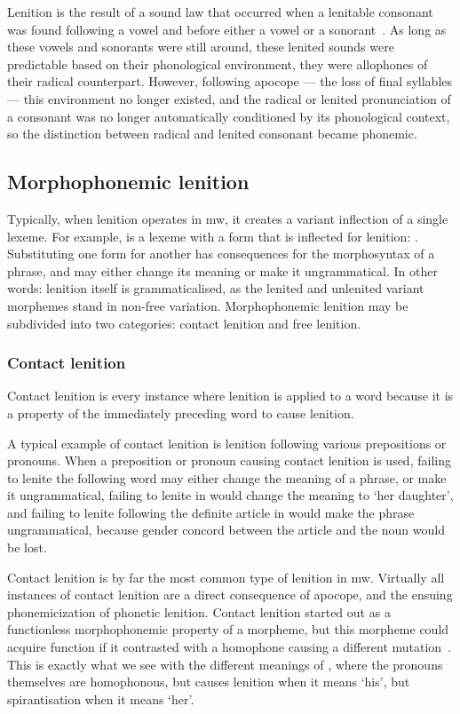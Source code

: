Lenition is the result of a sound law that occurred when a lenitable consonant was found following a vowel and before either a vowel or a sonorant~\autocite[96]{mccone_towards_1996}. 
As long as these vowels and sonorants were still around, these lenited sounds were predictable based on their phonological environment, \ie they were allophones of their radical counterpart. 
However, following apocope --- the loss of final syllables --- this environment no longer existed, and the radical or lenited pronunciation of a consonant was no longer automatically conditioned by its phonological context, so the distinction between radical and lenited consonant became phonemic.

\subsection{Morphophonemic lenition}
\label{sec:morph-lenit}
Typically, when lenition operates in \gls{mw}, it creates a variant inflection of a single lexeme. 
For example,  is a lexeme with a form that is inflected for lenition: . 
Substituting one form for another has consequences for the morphosyntax of a phrase, and may either change its meaning or make it ungrammatical.
In other words: lenition itself is grammaticalised, as the lenited and unlenited variant morphemes stand in non-free variation.
Morphophonemic lenition may be subdivided into two categories: contact lenition and free lenition.
\subsubsection{Contact lenition}
\label{sec:contact-lenition}
Contact lenition is every instance where lenition is applied to a word because it is a property of the immediately preceding word to cause lenition. 

A typical example of contact lenition is lenition following various prepositions or pronouns. 
When a preposition or pronoun causing contact lenition is used, failing to lenite the following word may either change the meaning of a phrase, or make it ungrammatical, \eg failing to lenite  in  would change the meaning to `her daughter', and failing to lenite following the definite article in  would make the phrase ungrammatical, because  gender concord between the article and the noun would be lost.

Contact lenition is by far the most common type of lenition in \gls{mw}. Virtually all instances of contact lenition are a direct consequence of apocope, and the ensuing phonemicization of phonetic lenition. Contact lenition started out as a functionless morphophonemic property of a morpheme,  but this morpheme could acquire function if it contrasted with a homophone causing a different mutation~\autocite[1]{schrijver_free_2010}. This is exactly what we see with the different meanings of , where the pronouns themselves are homophonous, but  causes lenition when it means `his', but spirantisation when it means `her'.

